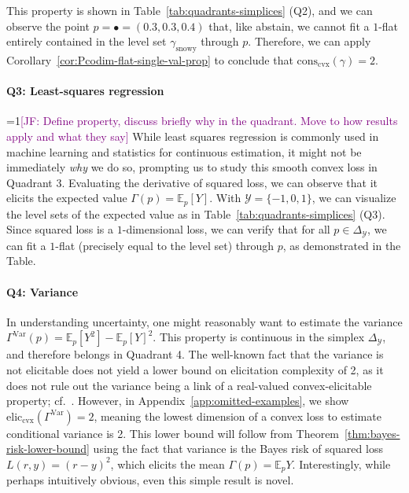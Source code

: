 \documentclass[11pt]{article} %
\newcommand{\Comments}{1}
\newcommand{\mynote}[2]{\ifnum\Comments=1\textcolor{#1}{#2}\fi}
\newcommand{\jessie}[1]{\mynote{purple}{[JF: #1]}}
\newcommand{\simplex}{\Delta_\Y}
\newcommand{\eliccvx}{\mathrm{elic}_\mathrm{cvx}}
\newcommand{\conscvx}{\mathrm{cons}_\mathrm{cvx}}
\newcommand{\E}{\mathbb{E}}
\newcommand{\Y}{\mathcal{Y}}
\newcommand{\Var}{\mathrm{Var}}
\begin{document}
This property is shown in Table~\ref{tab:quadrants-simplices} (Q2), and we can observe the point $p = \bullet = (0.3,0.3,0.4)$ that, like abstain, we cannot fit a $1$-flat entirely contained in the level set $\gamma_{\text{snowy}}$ through $p$.
Therefore, we can apply Corollary~\ref{cor:Pcodim-flat-single-val-prop} to conclude that $\conscvx(\gamma) = 2$.

\paragraph{Q3: Least-squares regression}
\jessie{Define property, discuss briefly why in the quadrant.  Move to how results apply and what they say}
While least squares regression is commonly used in machine learning and statistics for continuous estimation, it might not be immediately \emph{why} we do so, prompting us to study this smooth convex loss in Quadrant 3.
Evaluating the derivative of squared loss, we can observe that it elicits the expected value $\Gamma(p) = \E_p[Y]$.
With $\Y = \{-1,0,1\}$, we can visualize the level sets of the expected value as in Table~\ref{tab:quadrants-simplices} (Q3).
Since squared loss is a $1$-dimensional loss, we can verify that for all $p \in \simplex$, we can fit a $1$-flat (precisely equal to the level set) through $p$, as demonstrated in the Table.

\paragraph{Q4: Variance}
In understanding uncertainty, one might reasonably want to estimate the variance $\Gamma^\Var(p) = \E_p[Y^2] - \E_p[Y]^2$.
This property is continuous in the simplex $\simplex$, and therefore belongs in Quadrant 4.
The well-known fact that the variance is not elicitable does not yield a lower bound on elicitation complexity of 2, as it does not rule out the variance being a link of a real-valued convex-elicitable property; cf.~\citet[Remark 1]{frongillo2020elicitation}.
However, in Appendix~\ref{app:omitted-examples}, we show $\eliccvx(\Gamma^\Var)=2$, meaning the lowest dimension of a convex loss to estimate conditional variance is 2. %
This lower bound will follow from Theorem~\ref{thm:bayes-risk-lower-bound} using the fact that variance is the Bayes risk of squared loss $L(r,y) = (r-y)^2$, which elicits the mean $\Gamma(p) = \E_p Y$.
Interestingly, while perhaps intuitively obvious, even this simple result is novel.
\end{document}
